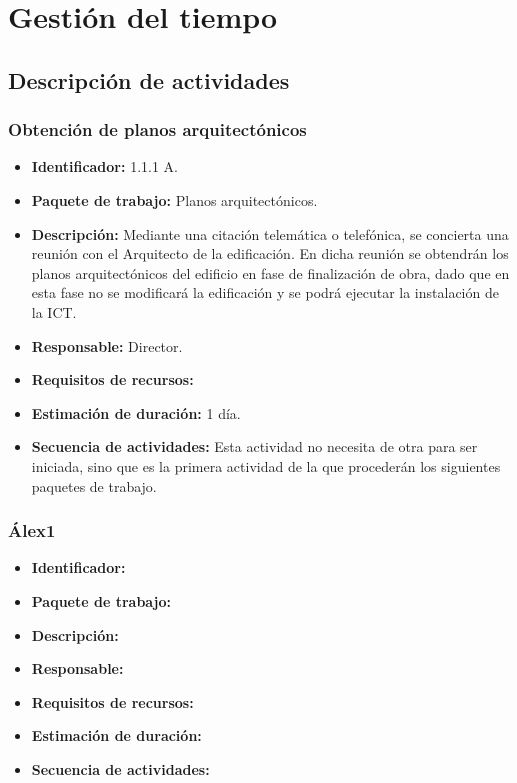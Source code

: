 \chapter{Gestión del tiempo}

\section{Descripción de actividades}


\subsection{Obtención de planos arquitectónicos}
\begin{itemize}
\item \textbf{Identificador: }1.1.1 A.
\item \textbf{Paquete de trabajo: }Planos arquitectónicos.
\item \textbf{Descripción: }Mediante una citación telemática o telefónica, se concierta una reunión con el Arquitecto de la edificación. En dicha reunión se obtendrán los planos arquitectónicos del edificio en fase de finalización de obra, dado que en esta fase no se modificará la edificación y se podrá ejecutar la instalación de la ICT.
\item \textbf{Responsable: }Director.
\item \textbf{Requisitos de recursos: }
\item \textbf{Estimación de duración: }1 día.
\item \textbf{Secuencia de actividades: }Esta actividad no necesita de otra para ser iniciada, sino que es la primera actividad de la que procederán los siguientes paquetes de trabajo.
\end{itemize}

\subsection{Álex1}
\begin{itemize}
\item \textbf{Identificador: }
\item \textbf{Paquete de trabajo: }
\item \textbf{Descripción: }
\item \textbf{Responsable: }
\item \textbf{Requisitos de recursos: }
\item \textbf{Estimación de duración: }
\item \textbf{Secuencia de actividades: }
\end{itemize}

